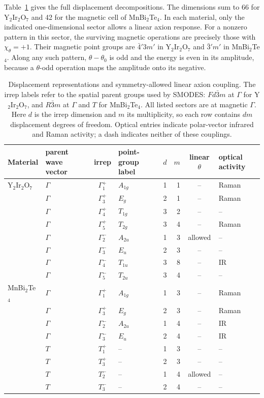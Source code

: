 \documentclass[galley,aps,pra,10pt,amsmath,amssymb,
    superscriptaddress,nofootinbib,longbibliography]{revtex4-2}
\newcounter{comm}
\newcommand{\code}[1]{\textsc{#1}}
\newcommand{\MBT}{MnBi$_2$Te$_4$}
\newcommand{\YIO}{Y$_2$Ir$_2$O$_7$}
\begin{document}
Table~\ref{tab:irreps} gives the full displacement decompositions. The dimensions sum to 66 for \YIO{} and 42 for the magnetic cell of \MBT{}. In each material, only the indicated one-dimensional sector allows a linear axion response. For a nonzero pattern in this sector, the surviving magnetic operations are precisely those with $\chi_\theta=+1$. Their magnetic point groups are $\bar4'3m'$ in \YIO{} and $\bar3'm'$ in \MBT{}. Along any such pattern, $\theta-\theta_0$ is odd and the energy is even in its amplitude, because a $\theta$-odd operation maps the amplitude onto its negative.

\begin{table}[t]
\caption{Displacement representations and symmetry-allowed linear axion coupling. The irrep labels refer to the spatial parent groups used by \code{SMODES}: $Fd\bar3m$ at $\Gamma$ for \YIO{}, and $R\bar3m$ at $\Gamma$ and $T$ for \MBT{}. All listed sectors are at magnetic $\Gamma$. Here $d$ is the irrep dimension and $m$ its multiplicity, so each row contains $dm$ displacement degrees of freedom. Optical entries indicate polar-vector infrared and Raman activity; a dash indicates neither of these couplings.}
\label{tab:irreps}
\begin{ruledtabular}
\begin{tabular}{@{}llclrrcl@{}}
Material & parent wave vector & irrep & point-group label & $d$ & $m$
& linear $\theta$ & optical activity \\
\hline
\YIO{} & $\Gamma$ & $\Gamma_1^+$ & $A_{1g}$ & 1 & 1 & -- & Raman \\
 & $\Gamma$ & $\Gamma_3^+$ & $E_g$ & 2 & 1 & -- & Raman \\
 & $\Gamma$ & $\Gamma_4^+$ & $T_{1g}$ & 3 & 2 & -- & -- \\
 & $\Gamma$ & $\Gamma_5^+$ & $T_{2g}$ & 3 & 4 & -- & Raman \\
 & $\Gamma$ & $\Gamma_2^-$ & $A_{2u}$ & 1 & 3 & allowed & -- \\
 & $\Gamma$ & $\Gamma_3^-$ & $E_u$ & 2 & 3 & -- & -- \\
 & $\Gamma$ & $\Gamma_4^-$ & $T_{1u}$ & 3 & 8 & -- & IR \\
 & $\Gamma$ & $\Gamma_5^-$ & $T_{2u}$ & 3 & 4 & -- & -- \\
\hline
\MBT{} & $\Gamma$ & $\Gamma_1^+$ & $A_{1g}$ & 1 & 3 & -- & Raman \\
 & $\Gamma$ & $\Gamma_3^+$ & $E_g$ & 2 & 3 & -- & Raman \\
 & $\Gamma$ & $\Gamma_2^-$ & $A_{2u}$ & 1 & 4 & -- & IR \\
 & $\Gamma$ & $\Gamma_3^-$ & $E_u$ & 2 & 4 & -- & IR \\
 & $T$ & $T_1^+$ & -- & 1 & 3 & -- & -- \\
 & $T$ & $T_3^+$ & -- & 2 & 3 & -- & -- \\
 & $T$ & $T_2^-$ & -- & 1 & 4 & allowed & -- \\
 & $T$ & $T_3^-$ & -- & 2 & 4 & -- & -- \\
\end{tabular}
\end{ruledtabular}
\vspace{2pt}
\end{table}
\end{document}
